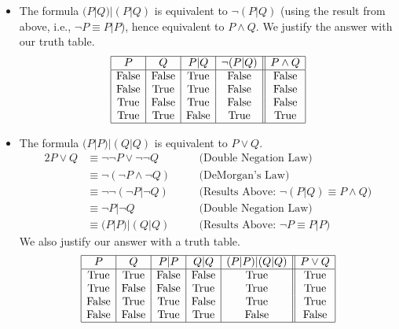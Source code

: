 \begin{enumerate}[label=(\alph*)]
\begin{itemize}
    \item The formula $(P | Q) | (P | Q)$ is equivalent to $\neg (P | Q)$ (using the result from above, i.e., $\neg P \equiv P | P$), hence equivalent to $P \wedge Q$. We justify the answer with our truth table.
    \[
    \begin{array}{|c|c|c|c||c|}
    \hline
    P & Q & P | Q & \neg (P | Q) & P \wedge Q \\
    \hline
    \text{False} & \text{False} & \text{True} & \text{False} & \text{False}\\
    \text{False} & \text{True} & \text{True} & \text{False} & \text{False} \\
    \text{True} & \text{False} & \text{True} & \text{False} & \text{False} \\
    \text{True} & \text{True} & \text{False} & \text{True} & \text{True} \\
    \hline
    \end{array}
    \]

    \item The formula $(P | P) | (Q | Q)$ is equivalent to $P \vee Q$.
    \begin{alignat*}{2}
        P \vee Q & \equiv \neg \neg P \vee \neg \neg Q && \quad \text{(Double Negation Law)} \\
                   & \equiv \neg (\neg P \wedge \neg Q) && \quad \text{(DeMorgan's Law)} \\
                   & \equiv \neg \neg (\neg P | \neg Q) && \quad \text{(Results Above: $\neg(P | Q) \equiv P \wedge Q$)} \\
                   & \equiv \neg P | \neg Q && \quad \text{(Double Negation Law)} \\
                   & \equiv (P | P) | (Q | Q) && \quad \text{(Results Above: $\neg P \equiv P | P$)}
    \end{alignat*}
    We also justify our answer with a truth table.
    \[
    \begin{array}{|c|c|c|c|c||c|}
    \hline
    P & Q & P | P & Q | Q & (P | P) | (Q | Q) & P \vee Q \\
    \hline
    \text{True} & \text{True} & \text{False} & \text{False} & \text{True} & \text{True} \\
    \text{True} & \text{False} & \text{False} & \text{True} & \text{True} & \text{True} \\
    \text{False} & \text{True} & \text{True} & \text{False} & \text{True} & \text{True} \\      
    \text{False} & \text{False} & \text{True} & \text{True} & \text{False} & \text{False} \\
    \hline
    \end{array}
    \]
\end{itemize}
\end{enumerate}

\pagebreak